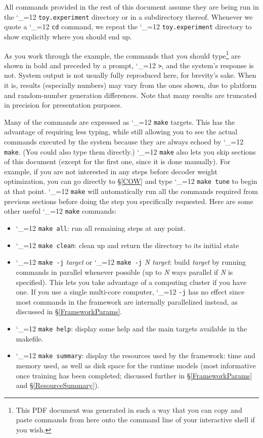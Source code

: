 \documentclass[11pt,letterpaper]{article}
\def\code{\begingroup\catcode`\_=12 \codex}
\newcommand{\codex}[1]{\texttt{#1}\endgroup}
\begin{document}
All commands provided in the rest of this document assume they are being run in
the \code{toy.experiment} directory or in a subdirectory thereof.  Whenever we
quote a \code{cd} command, we repeat the \code{toy.experiment} directory to
show explicitly where you should end up.

As you work through the example, the commands that you should type\footnote{This
   PDF document was generated in such a way that you can copy and paste commands
   from here onto the command line of your interactive shell if you wish.}
are shown in bold and preceded by a prompt, \code{>}, and the system's response
is not.  System output is not usually fully reproduced here, for brevity's
sake. When it is, results (especially numbers) may vary from the ones
shown, due to platform and random-number generation differences. Note that many results are
truncated in precision for presentation purposes.

Many of the commands are expressed as \code{make} targets. This has the
advantage of requiring less typing, while still allowing you to see the actual
commands executed by the system because they are always echoed by \code{make}.
(You could also type them directly.) \code{make} also lets you skip
sections of this document (except for the first one, since it is done
manually). For example, if you are not interested in any steps before decoder
weight optimization, you can go directly to \S\ref{COW} and type
\code{make tune} to begin at that point. \code{make} will automatically run all
the commands required from previous sections before doing the step you
specifically requested. Here are some other useful \code{make} commands:
\begin{itemize}
\item \code{make all}: run all remaining steps at any point.
\item \code{make clean}: clean up and return the directory to its initial state
\item \code{make -j} \emph{target} or \code{make -j} \emph{N target}: build
      \emph{target} by running commands in parallel whenever possible (up to
      \emph{N} ways parallel if \emph{N} is specified). This lets you take
      advantage of a computing cluster if you have one. If you use a single
      multi-core computer, \code{-j} has no effect since most commands in the
      framework are internally parallelized instead, as discussed in
      \S\ref{FrameworkParams}.
\item \code{make help}: display some help and the main targets available in
      the makefile.
\item \code{make summary}: display the resources used by the framework: time
      and memory used, as well as disk space for the runtime models (most
      informative once training has been completed; discussed further in
      \S\ref{FrameworkParams} and \S\ref{ResourceSummary}).
\end{itemize}
\end{document}
